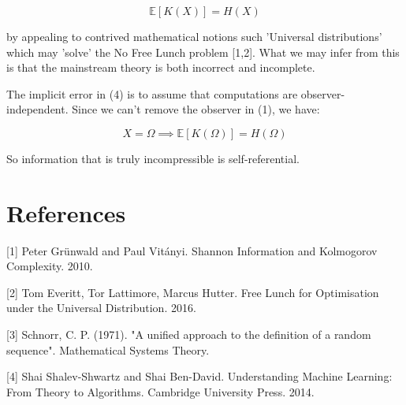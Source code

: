 \documentclass{article}
\begin{document}
\begin{equation}
\mathbb{E}[K(X)] = H(X)
\end{equation}

by appealing to contrived mathematical notions such 'Universal distributions' which may 'solve' the No Free Lunch problem [1,2]. What we may infer from this is that the mainstream theory is both incorrect and incomplete. 

The implicit error in (4) is to assume that computations are observer-independent. Since we can't remove the observer in (1),
we have:

\begin{equation}
X = \Omega \implies \mathbb{E}[K(\Omega)] = H(\Omega)
\end{equation}

So information that is truly incompressible is self-referential.


\section*{References}

\small
[1] Peter Grünwald and Paul Vitányi. Shannon Information and Kolmogorov Complexity. 2010.

[2] Tom Everitt, Tor Lattimore, Marcus Hutter. Free Lunch for Optimisation under the Universal Distribution. 2016.

[3] Schnorr, C. P. (1971). "A unified approach to the definition of a random sequence". Mathematical Systems Theory.

[4] Shai Shalev-Shwartz and Shai Ben-David. Understanding Machine Learning: From Theory to Algorithms. Cambridge University Press. 2014. 
\end{document}
